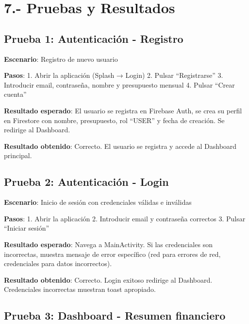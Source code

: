 \documentclass[
  spanish,
  11pt,
  paper=a4,
  ,captions=tableheading
]{scrartcl}
\begin{document}
\newpage

\hypertarget{pruebas-y-resultados}{%
\section{7.- Pruebas y Resultados}\label{pruebas-y-resultados}}

\hypertarget{prueba-1-autenticaciuxf3n---registro}{%
\subsection{Prueba 1: Autenticación -
Registro}\label{prueba-1-autenticaciuxf3n---registro}}

\textbf{Escenario}: Registro de nuevo usuario

\textbf{Pasos}: 1. Abrir la aplicación (Splash → Login) 2. Pulsar
``Registrarse'' 3. Introducir email, contraseña, nombre y presupuesto
mensual 4. Pulsar ``Crear cuenta''

\textbf{Resultado esperado}: El usuario se registra en Firebase Auth, se
crea su perfil en Firestore con nombre, presupuesto, rol ``USER'' y
fecha de creación. Se redirige al Dashboard.

\textbf{Resultado obtenido}: Correcto. El usuario se registra y accede
al Dashboard principal.

\hypertarget{prueba-2-autenticaciuxf3n---login}{%
\subsection{Prueba 2: Autenticación -
Login}\label{prueba-2-autenticaciuxf3n---login}}

\textbf{Escenario}: Inicio de sesión con credenciales válidas e
inválidas

\textbf{Pasos}: 1. Abrir la aplicación 2. Introducir email y contraseña
correctos 3. Pulsar ``Iniciar sesión''

\textbf{Resultado esperado}: Navega a MainActivity. Si las credenciales
son incorrectas, muestra mensaje de error específico (red para errores
de red, credenciales para datos incorrectos).

\textbf{Resultado obtenido}: Correcto. Login exitoso redirige al
Dashboard. Credenciales incorrectas muestran toast apropiado.

\hypertarget{prueba-3-dashboard---resumen-financiero}{%
\subsection{Prueba 3: Dashboard - Resumen
financiero}\label{prueba-3-dashboard---resumen-financiero}}
\end{document}
